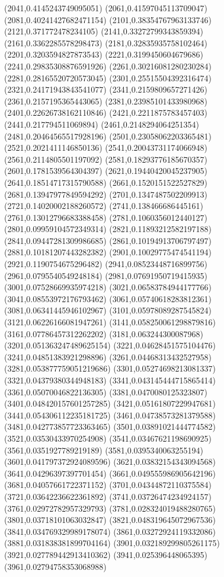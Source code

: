 {(2041,0.4145243749095051)
(2061,0.41597045113709047)
(2081,0.40241427682471154)
(2101,0.38354767963133746)
(2121,0.371772478234105)
(2141,0.33272799343859394)
(2161,0.3362285578298473)
(2181,0.32835935758102464)
(2201,0.3203594827873543)
(2221,0.3199450604679686)
(2241,0.29835308876591926)
(2261,0.30216081280230284)
(2281,0.28165520720573045)
(2301,0.25515504392316474)
(2321,0.24171943843541077)
(2341,0.2159809657271426)
(2361,0.2157195365443065)
(2381,0.23985101433980968)
(2401,0.22626738162110846)
(2421,0.2211875783457403)
(2441,0.217794511069894)
(2461,0.2148294064251354)
(2481,0.20464565517928196)
(2501,0.23058062203365481)
(2521,0.2021411146850136)
(2541,0.20043731174066948)
(2561,0.2114805501197092)
(2581,0.18293776185670357)
(2601,0.1781539564304397)
(2621,0.19440420045237905)
(2641,0.18514717315790588)
(2661,0.1520151522527829)
(2681,0.13947977849594292)
(2701,0.1347487502209913)
(2721,0.14020002188260572)
(2741,0.138466686445161)
(2761,0.13012796683388458)
(2781,0.1060356012440127)
(2801,0.09959104572349314)
(2821,0.11893212582197188)
(2841,0.09447281309986685)
(2861,0.10194913706797497)
(2881,0.10181207443282382)
(2901,0.10029775474541194)
(2921,0.1190754675296482)
(2941,0.08523448716899756)
(2961,0.0795540549248184)
(2981,0.07691950719415935)
(3001,0.07528669935974218)
(3021,0.06583784944177766)
(3041,0.08553972176793462)
(3061,0.05740618283812361)
(3081,0.06341445946102967)
(3101,0.05978089287545824)
(3121,0.06226166081947261)
(3141,0.058250061298879816)
(3161,0.07786457312262202)
(3181,0.063244300087968)
(3201,0.051363247489625154)
(3221,0.04628451575104476)
(3241,0.04851383921298896)
(3261,0.04468313432527958)
(3281,0.053877759051219686)
(3301,0.05274698213081337)
(3321,0.04379380344948183)
(3341,0.043145444715865414)
(3361,0.05070046822136305)
(3381,0.0470080125323807)
(3401,0.048420157601257285)
(3421,0.05161807229947681)
(3441,0.054306112235181725)
(3461,0.04738573281379588)
(3481,0.042773857723363465)
(3501,0.03891021444774582)
(3521,0.03530433970254908)
(3541,0.03467621198690925)
(3561,0.0351927789219189)
(3581,0.0395340063255194)
(3601,0.041797372924089596)
(3621,0.03832154343094568)
(3641,0.04296397397701454)
(3661,0.049555986905642196)
(3681,0.04057661722371152)
(3701,0.04344872110375584)
(3721,0.03642236622361892)
(3741,0.03726474234924157)
(3761,0.02972782957329793)
(3781,0.028324019488280765)
(3801,0.03718101063032847)
(3821,0.048319645072967536)
(3841,0.034769329989178074)
(3861,0.03272924119332086)
(3881,0.031838381899704164)
(3901,0.032189299805261175)
(3921,0.027789442913410362)
(3941,0.025396448065395)
(3961,0.02794758353068988)
}
